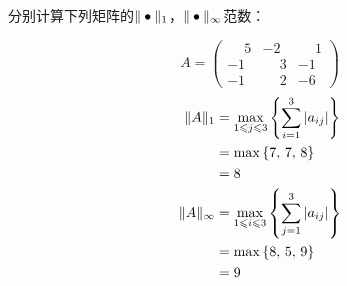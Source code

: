 \documentclass[11pt]{article}
\begin{document}
\maketitle

\thispagestyle{empty}

\newpage

\begin{question}

    \questiontext
    {
        分别计算下列矩阵的$\Arrowvert \bullet \Arrowvert_1$，$\Arrowvert \bullet \Arrowvert_\infty$范数：
    }
    \begin{subquestion}{}
        \questiontext
        {
            \begin{equation*}
                A = \begin{pmatrix}
                    \phantom{-}5 & -2           & \phantom{-}1 \\
                    -1           & \phantom{-}3 & -1           \\
                    -1           & \phantom{-}2 & -6
                \end{pmatrix}
            \end{equation*}
        }
        \answer
        {
            \begin{align*}
                \Arrowvert A \Arrowvert_1      & = \max_{1 \leqslant j \leqslant 3}{\left\{\sum_{i = 1}^{3}{\arrowvert a_{ij} \arrowvert}\right\}} \\
                                               & = \max{\{7,\, 7,\, 8\}}                                                                           \\
                                               & = 8                                                                                               \\
                \Arrowvert A \Arrowvert_\infty & = \max_{1 \leqslant i \leqslant 3}{\left\{\sum_{j = 1}^{3}{\arrowvert a_{ij} \arrowvert}\right\}} \\
                                               & = \max{\{8,\, 5,\, 9\}}                                                                           \\
                                               & = 9
            \end{align*}
        }
    \end{subquestion}
    \begin{subquestion}{}
        \questiontext
        {
            \begin{equation*}

\end{equation*}}
\end{subquestion}
\end{question}
\end{document}

